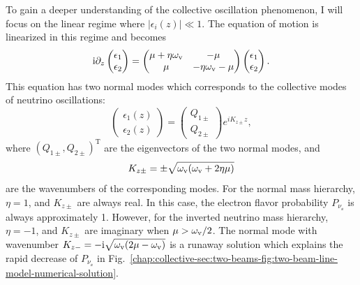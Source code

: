 To gain a deeper understanding of the collective oscillation phenomenon, I will focus on the linear regime where $\lvert \epsilon_i(z) \rvert \ll 1$. The equation of motion is linearized in this regime and becomes
\begin{equation}
    \ri \partial_z \begin{pmatrix}
        \epsilon_1 \\
        \epsilon_2
    \end{pmatrix} =  \begin{pmatrix}
        \mu + \eta\omega_\vv & - \mu \\
        \mu & - \eta\omega_\vv - \mu
    \end{pmatrix} \begin{pmatrix}
        \epsilon_1 \\
        \epsilon_2
    \end{pmatrix}.
    \label{chap:collective-sec:bipolar-linearized-eom}
\end{equation}
This equation has two normal modes which corresponds to the collective modes of neutrino oscillations:
\begin{equation}
    \begin{pmatrix}
        \epsilon_1 (z) \\
        \epsilon_2 (z)
    \end{pmatrix} = \begin{pmatrix}
        Q_{1\pm} \\
        Q_{2\pm}
    \end{pmatrix} e^{i K_{z\pm} z},
    \label{chap:collective-sec:two-beams-eqn:equation-of-motion-collective-mode-assumption}
\end{equation}
where $(Q_{1\pm}, Q_{2\pm})^{\mathrm T}$ are the eigenvectors of the two normal modes, and
\begin{equation}
    K_{z\pm} = \pm \sqrt{ \omega_\mathrm v (\omega_\mathrm v + 2 \eta \mu) }
\end{equation}
are the wavenumbers of the corresponding modes. For the normal mass hierarchy, $\eta = 1$, and $K_{z\pm}$ are always real. In this case, the electron flavor probability $P_{\nu_\ee}$ is always approximately 1. However, for the inverted neutrino mass hierarchy, $\eta=-1$, and $K_{z\pm}$ are imaginary when $\mu > \omega_\mathrm v/2$. The normal mode with wavenumber $K_{z-} = -\mathrm{i} \sqrt{ \omega_\mathrm v (2 \mu-\omega_\mathrm v) }$ is a runaway solution which explains the rapid decrease of $P_{\nu_\ee}$ in Fig.~\ref{chap:collective-sec:two-beams-fig:two-beam-line-model-numerical-solution}.





